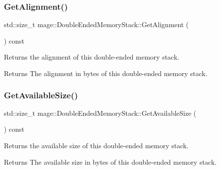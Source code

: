 \subsubsection{\texorpdfstring{Get\+Alignment()}{GetAlignment()}}
{\footnotesize\ttfamily std\+::size\+\_\+t mage\+::\+Double\+Ended\+Memory\+Stack\+::\+Get\+Alignment (\begin{DoxyParamCaption}{ }\end{DoxyParamCaption}) const\hspace{0.3cm}{\ttfamily [noexcept]}}

Returns the alignment of this double-\/ended memory stack.

\begin{DoxyReturn}{Returns}
The alignment in bytes of this double-\/ended memory stack. 
\end{DoxyReturn}
\mbox{\label{classmage_1_1_double_ended_memory_stack_a19bd2960457d557f30c99e06cdf22252}} 
\subsubsection{\texorpdfstring{Get\+Available\+Size()}{GetAvailableSize()}}
{\footnotesize\ttfamily std\+::size\+\_\+t mage\+::\+Double\+Ended\+Memory\+Stack\+::\+Get\+Available\+Size (\begin{DoxyParamCaption}{ }\end{DoxyParamCaption}) const\hspace{0.3cm}{\ttfamily [noexcept]}}

Returns the available size of this double-\/ended memory stack.

\begin{DoxyReturn}{Returns}
The available size in bytes of this double-\/ended memory stack. 
\end{DoxyReturn}
\mbox{\label{classmage_1_1_double_ended_memory_stack_ada139d8c39960c794502bec401182ce9}} 
